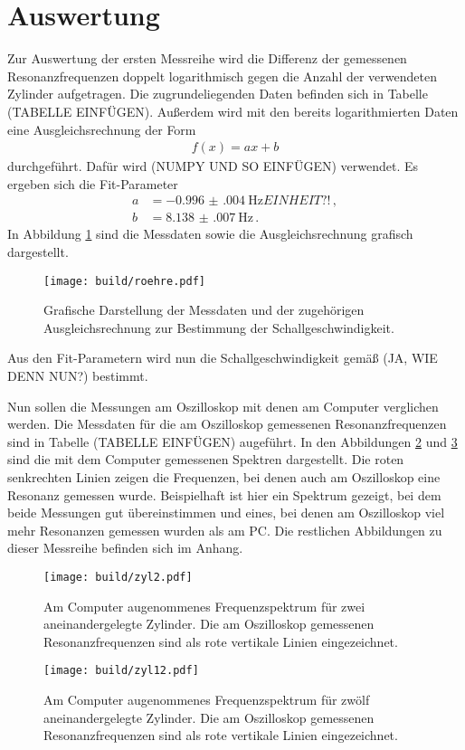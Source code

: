 \section{Auswertung}
\label{sec:Auswertung}
Zur Auswertung der ersten Messreihe wird die Differenz der gemessenen
Resonanzfrequenzen doppelt logarithmisch gegen die Anzahl der verwendeten Zylinder
aufgetragen. Die zugrundeliegenden Daten befinden sich in Tabelle (TABELLE EINFÜGEN).
Außerdem wird mit den bereits logarithmierten Daten eine Ausgleichsrechnung der
Form
\begin{align*}
  f(x)=ax+b
\end{align*}
durchgeführt. Dafür wird (NUMPY UND SO EINFÜGEN) verwendet. Es ergeben sich die
Fit-Parameter
\begin{align*}
  a&=\SI{-0.996(004)}{\Hz} EINHEIT?!\,, \\
  b&=\SI{8.138(007)}{\Hz}\,.
\end{align*}
In Abbildung \ref{fig:roehre} sind die Messdaten sowie die Ausgleichsrechnung grafisch
dargestellt.

\begin{figure}
  \centering
  \texttt{[image: build/roehre.pdf]}
  \caption{Grafische Darstellung der Messdaten und der zugehörigen Ausgleichsrechnung
  zur Bestimmung der Schallgeschwindigkeit.}
  \label{fig:roehre}
\end{figure}

Aus den Fit-Parametern wird nun die Schallgeschwindigkeit gemäß (JA, WIE DENN NUN?)
bestimmt.


Nun sollen die Messungen am Oszilloskop mit denen am Computer verglichen werden.
Die Messdaten für die am Oszilloskop gemessenen Resonanzfrequenzen sind in Tabelle
(TABELLE EINFÜGEN) augeführt.
In den Abbildungen \ref{fig:zyl2} und \ref{fig:zyl12} sind die mit dem Computer gemessenen
Spektren dargestellt. Die roten senkrechten Linien zeigen die Frequenzen, bei denen
auch am Oszilloskop eine Resonanz gemessen wurde. Beispielhaft ist hier ein Spektrum
gezeigt, bei dem beide Messungen gut übereinstimmen und eines, bei denen am Oszilloskop
viel mehr Resonanzen gemessen wurden als am PC. Die restlichen Abbildungen zu dieser
Messreihe befinden sich im Anhang.

\begin{figure}
  \centering
  \texttt{[image: build/zyl2.pdf]}
  \caption{Am Computer augenommenes Frequenzspektrum für zwei aneinandergelegte
  Zylinder. Die am Oszilloskop gemessenen Resonanzfrequenzen sind als rote vertikale
  Linien eingezeichnet.}
  \label{fig:zyl2}
\end{figure}
\begin{figure}
  \centering
  \texttt{[image: build/zyl12.pdf]}
  \caption{Am Computer augenommenes Frequenzspektrum für zwölf aneinandergelegte
  Zylinder. Die am Oszilloskop gemessenen Resonanzfrequenzen sind als rote vertikale
  Linien eingezeichnet.}
  \label{fig:zyl12}
\end{figure}



